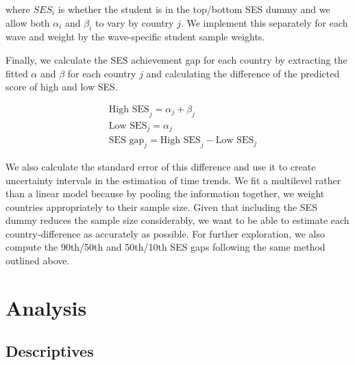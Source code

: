 \documentclass[11pt, a4paper]{article}\usepackage[]{graphicx}\usepackage[]{color}
\begin{document}
where \(SES_i\) is whether the student is in the top/bottom SES dummy and we allow both \(\alpha_i\) and \(\beta_i\) to vary by country \(j\). We implement this separately for each wave and weight by the wave-specific student sample weights.

Finally, we calculate the SES achievement gap for each country by extracting the fitted \(\alpha\) and \(\beta\) for each country \(j\) and calculating the difference of the predicted score of high and low SES.

\begin{equation}
\begin{split}
\quad \text{High SES}_j = \alpha_j + \beta_j \\
\quad \text{Low SES}_j = \alpha_j \\
\quad \text{SES gap}_j = \text{High SES}_j - \text{Low SES}_j
\end{split}
\end{equation}

We also calculate the standard error of this difference and use it to create uncertainty intervals in the estimation of time trends. We fit a multilevel rather than a linear model because by pooling the information together, we weight countries appropriately to their sample size. Given that including the SES dummy reduces the sample size considerably, we want to be able to estimate each country-difference as accurately as possible. For further exploration, we also compute the 90th/50th and 50th/10th SES gaps following the same method outlined above.

\section{Analysis}

\subsection{Descriptives}




\end{document}
